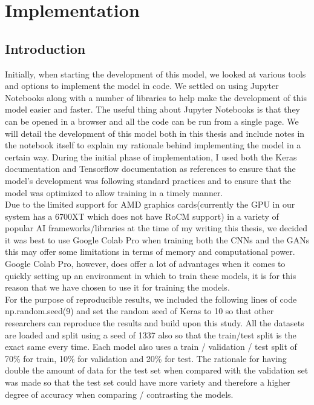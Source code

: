 \chapter{Implementation}
\section{Introduction}
Initially, when starting the development of this model, we looked at various tools and options to implement the model in code.  We settled on using Jupyter Notebooks along with a number of libraries to help make the development of this model easier and faster.  The useful thing about Jupyter Notebooks is that they can be opened in a browser and all the code can be run from a single page.  We will detail the development of this model both in this thesis and include notes in the notebook itself to explain my rationale behind implementing the model in a certain way.  During the initial phase of implementation, I used both the Keras documentation \cite{keras} and Tensorflow documentation \cite{tensorflow} as references to ensure that the model's development was following standard practices and to ensure that the model was optimized to allow training in a timely manner. 
\\
Due to the limited support for AMD graphics cards(currently the GPU in our system has a 6700XT which does not have RoCM support\cite{amdLimitations}) in a variety of popular AI frameworks/libraries at the time of my writing this thesis, we decided it was best to use Google Colab Pro when training both the CNNs and the GANs this may offer some limitations in terms of memory and computational power.  Google Colab Pro, however, does offer a lot of advantages when it comes to quickly setting up an environment in which to train these models, it is for this reason that we have chosen to use it for training the models.
\\
For the purpose of reproducible results, we included the following lines of code np.random.seed(9) and set the random seed of Keras to 10 so that other researchers can reproduce the results and build upon this study.  All the datasets are loaded and split using a seed of 1337 also so that the train/test split is the exact same every time.  Each model also uses a train / validation / test split of 70\% for train, 10\% for validation and 20\% for test.  The rationale for having double the amount of data for the test set when compared with the validation set was made so that the test set could have more variety and therefore a higher degree of accuracy when comparing / contrasting the models.
